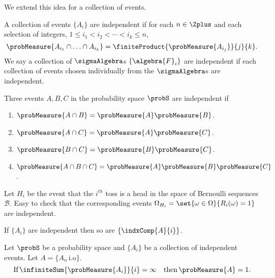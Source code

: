 We extend this idea for a collection of events.
\begin{Definition}[name=Independence of a collection of events and sigma algebras]
    A collection of events $\lbrace A_i \rbrace$ are independent if for each $n\in\Zplus$ and each selection
    of integers, $1\leq i_1 < i_2 < \cdots < i_k\leq n$,
    \[\probMeasure{A_{i_1}\cap\ldots\cap A_{i_k}} = \finiteProduct{\probMeasure{A_{i_j}}}{j}{k}.\]
    We say a collection of $\sigmaAlgebra$s $\lbrace \algebra{F}_i\rbrace$ are independent if each collection
    of events chosen individually from the $\sigmaAlgebra$s are independent.
\end{Definition}
\begin{Example}
    Three events $A,B,C$ in the probability space $\probS$ are independent if
    \begin{enumerate}
	\item
	    $\probMeasure{A\cap B} = \probMeasure{A}\probMeasure{B}$.
	\item
	    $\probMeasure{A\cap C} = \probMeasure{A}\probMeasure{C}$.
	\item
	    $\probMeasure{B\cap C} = \probMeasure{B}\probMeasure{C}$.
	\item
	    $\probMeasure{A\cap B\cap C} = \probMeasure{A}\probMeasure{B}\probMeasure{C}$.
    \end{enumerate}
\end{Example}
\begin{Example}
    Let $H_i$ be the event that the $i^{th}$ toss is a head in the space of Bernoulli sequences $\mathcal{B}$.
    Easy to check that the corresponding events $\Omega_{H_i} = \set{\omega\in\Omega}{R_i(\omega) = 1}$ 
    are independent.
\end{Example}
\begin{Proposition}
    If $\lbrace A_i\rbrace$ are independent then so are $\lbrace \indxComp{A}{i} \rbrace$.
\end{Proposition}
\begin{Theorem}[name=Second Borel-Cantelli Lemma]\label{thm:borel_cantelli_2}
    Let $\probS$ be a probability space and $\lbrace A_i \rbrace$ be a collection of independent events. Let
    $A =\lbrace A_n \,\text{i.o}\rbrace$. 
    \[\text{If}\,\infiniteSum{\probMeasure{A_i}}{i} = \infty\quad \text{then}\,\probMeasure{A} = 1.\]
\end{Theorem}
